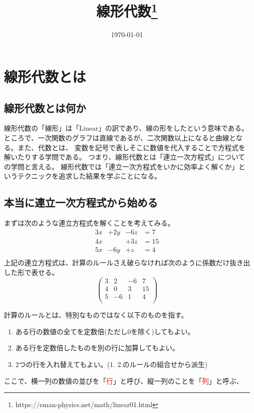 \documentclass[]{ltjsarticle}%
\title{線形代数\thanks{https://eman-physics.net/math/linear01.html}}
\author{}
\date{\today}
\begin{document}
\maketitle

\tableofcontents%
\clearpage

\section{線形代数とは}
\label{"sec:linear01"}

\subsection{線形代数とは何か}

線形代数の「線形」は「Linear」の訳であり、線の形をしたという意味である。
ところで、一次関数のグラフは直線であるが、二次関数以上になると曲線となる。また、代数とは、
変数を記号で表しそこに数値を代入することで方程式を解いたりする学問である。
つまり、線形代数とは「連立一次方程式」についての学問と言える。
線形代数では「連立一次方程式をいかに効率よく解くか」というテクニックを追求した結果を学ぶことになる。

\subsection{本当に連立一次方程式から始める}
まずは次のような連立方程式を解くことを考えてみる。
\begin{equation}
  \begin{matrix}
    \label{eq:eq1}
    3x & +2y & -6z & = 7  \\
    4x &     & +3z & = 15 \\
    5x & -6y & + z & = 4  \\
  \end{matrix}
\end{equation}
上記の連立方程式は、計算のルールさえ破らなければ次のように係数だけ抜き出した形で表せる。
\begin{equation}
  \label{eq:eq2}
  \left(
  \begin{array}{rrr|r}
      3 & 2  & -6 & 7  \\
      4 & 0  & 3  & 15 \\
      5 & -6 & 1  & 4  \\
    \end{array}
  \right)
\end{equation}

計算のルールとは、特別なものではなく以下のものを指す。
\begin{enumerate}
  \item ある行の数値の全てを定数倍(ただし0を除く)してもよい。
  \item ある行を定数倍したものを別の行に加算してもよい。
  \item 2つの行を入れ替えてもよい。(1. 2.のルールの組合せから派生)
\end{enumerate}
ここで、横一列の数値の並びを「\textcolor{red}{行}」と呼び、縦一列のことを「\textcolor{red}{列}」と呼ぶ、\\
\end{document}
